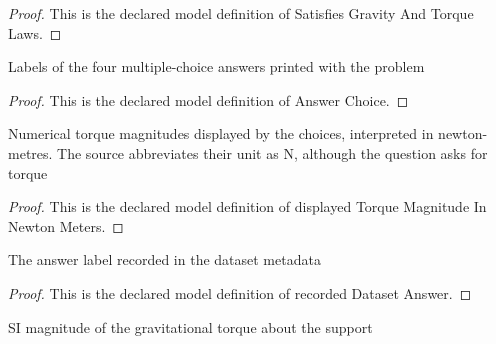 \begin{proof}
  This is the declared model definition of Satisfies Gravity And Torque Laws.
\end{proof}
\begin{definition}
  \label{def:physics:phyx-mini-0702:phyxminiproblems-problemphyxmini0702-answerchoice}
  Labels of the four multiple-choice answers printed with the problem
\end{definition}
\begin{proof}
  This is the declared model definition of Answer Choice.
\end{proof}
\begin{definition}
  \label{def:physics:phyx-mini-0702:phyxminiproblems-problemphyxmini0702-displayedtorquemagnitudeinnewtonmeters}
  Numerical torque magnitudes displayed by the choices, interpreted in newton-metres. The source abbreviates their unit as N, although the question asks for torque
\end{definition}
\begin{proof}
  This is the declared model definition of displayed Torque Magnitude In Newton Meters.
\end{proof}
\begin{definition}
  \label{def:physics:phyx-mini-0702:phyxminiproblems-problemphyxmini0702-recordeddatasetanswer}
  The answer label recorded in the dataset metadata
\end{definition}
\begin{proof}
  This is the declared model definition of recorded Dataset Answer.
\end{proof}
\begin{definition}
  \label{def:physics:phyx-mini-0702:phyxminiproblems-problemphyxmini0702-gravitationaltorquemagnitudeinnewtonmeters}
  SI magnitude of the gravitational torque about the support
\end{definition}
